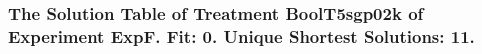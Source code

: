  \begin{frame}
 \fontsize{8pt}{9pt}\selectfont
 \frametitle{ The Solution Table of Treatment BoolT5sgp02k of Experiment ExpF. Fit: 0. Unique Shortest Solutions: 11. }

 \label{ExpFSolutionTable000.tex}  
 \end{frame}

